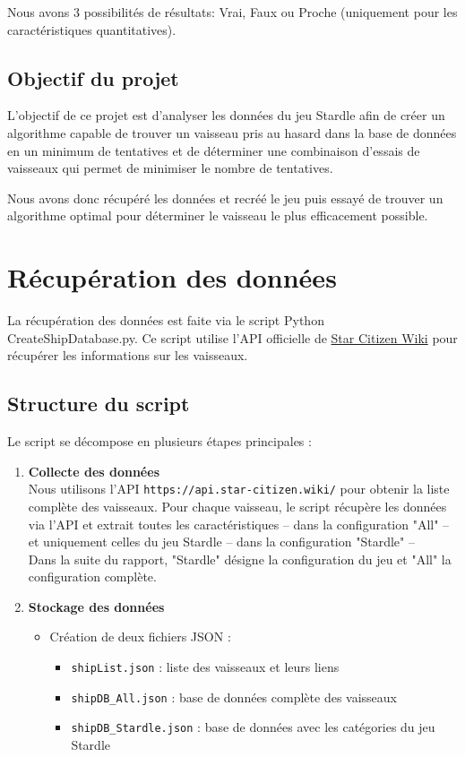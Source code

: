 \documentclass{article}
\begin{document}
Nous avons 3 possibilités de résultats: Vrai, Faux ou Proche (uniquement pour les caractéristiques quantitatives).
\subsection{Objectif du projet}

L'objectif de ce projet est d'analyser les données du jeu Stardle afin de créer un algorithme capable de trouver 
un vaisseau pris au hasard dans la base de données en un minimum de tentatives et de déterminer une combinaison 
d'essais de vaisseaux qui permet de minimiser le nombre de tentatives.

Nous avons donc récupéré les données et recréé le jeu puis essayé de trouver un 
algorithme optimal pour déterminer le vaisseau le plus efficacement possible.


\section{Récupération des données}
La récupération des données est faite via le script Python CreateShipDatabase.py. 
Ce script utilise l'API officielle de \href{https://starcitizen.tools/}{Star Citizen Wiki}  pour récupérer les informations sur les vaisseaux.

\subsection{Structure du script}
Le script se décompose en plusieurs étapes principales :

\begin{enumerate}   
    \item \textbf{Collecte des données} \\
    Nous utilisons l'API \verb|https://api.star-citizen.wiki/| pour obtenir la liste complète des 
    vaisseaux.
        Pour chaque vaisseau, le script récupère les données via l'API et 
        extrait toutes les caractéristiques -- dans la configuration "All" -- 
        et uniquement celles du jeu Stardle -- dans la configuration  "Stardle" --\\
        Dans la suite du rapport, "Stardle" désigne la configuration du jeu et "All" la configuration complète.
    \item \textbf{Stockage des données}
    
    \begin{itemize}
        \item Création de deux fichiers JSON :
        \begin{itemize}
            \item \verb|shipList.json| : liste des vaisseaux et leurs liens
            \item \verb|shipDB_All.json| : base de données complète des vaisseaux
            \item \verb|shipDB_Stardle.json| : base de données avec les catégories du jeu Stardle 
        \end{itemize}
    \end{itemize}
\end{enumerate}
\end{document}
